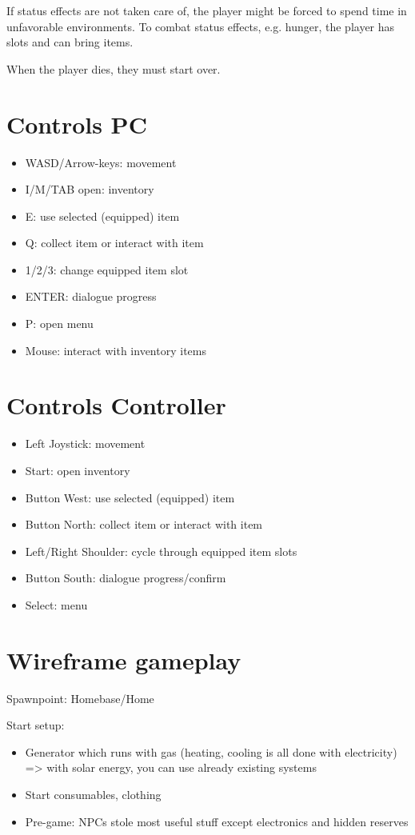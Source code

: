 \documentclass[a4paper]{scrreprt}
\begin{document}
If status effects are not taken care of, the player might be forced to spend time in unfavorable environments. To combat status effects, e.g. hunger, the player has slots and can bring items.

When the player dies, they must start over.

\section{Controls PC}
\begin{itemize}
    \item WASD/Arrow-keys: movement
    \item I/M/TAB open: inventory
    \item E: use selected (equipped) item
    \item Q: collect item or interact with item
    \item 1/2/3: change equipped item slot
    \item ENTER: dialogue progress
    \item P: open menu
    \item Mouse: interact with inventory items    
\end{itemize}

\section{Controls Controller}
\begin{itemize}
    \item Left Joystick: movement
    \item Start: open inventory
    \item Button West: use selected (equipped) item
    \item Button North: collect item or interact with item
    \item Left/Right Shoulder: cycle through equipped item slots
    \item Button South: dialogue progress/confirm
    \item Select: menu
\end{itemize}

\section{Wireframe gameplay}
\label{sec:gameplay}

Spawnpoint: Homebase/Home 

Start setup:
\begin{itemize}
    \item Generator which runs with gas (heating, cooling is all done with electricity) => with solar energy, you can use already existing systems
    \item Start consumables, clothing
    \item Pre-game: NPCs stole most useful stuff except electronics and hidden reserves
\end{itemize}
\end{document}
